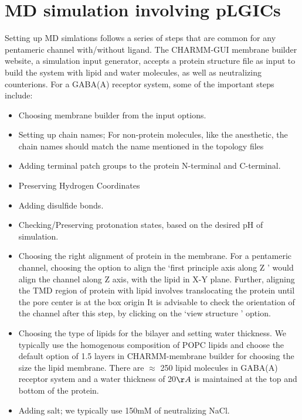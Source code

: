 \documentclass[12pt]{article}
\begin{document}
\section{MD simulation involving pLGICs}
\label{sec:genMD}
Setting up MD simlations follows a series of steps that are common for any pentameric channel with/without ligand. The CHARMM-GUI membrane builder website,\cite{Jo2009} a simulation input generator, accepts a protein structure file as input to build the system with lipid and water molecules, as well as neutralizing counterions. For a GABA(A) receptor system, some of the important steps include:
 	\begin{itemize}
		\item Choosing membrane builder from the input options.
		\item Setting up chain names; For non-protein molecules, like the anesthetic, the chain names should match the name mentioned in the topology files
		\item Adding terminal patch groups to the protein N-terminal and C-terminal.
		\item Preserving Hydrogen Coordinates
		\item Adding disulfide bonds.
		\item Checking/Preserving protonation states, based on the desired pH of simulation. 
		\item Choosing the right alignment of protein in the membrane. For a pentameric channel, choosing the option to align the `first principle axis along Z ' would align the channel along Z axis, with the lipid in X-Y plane. Further, aligning the TMD region of protein with lipid involves  translocating the protein until the pore center is at the box origin %
		It is advisable to check the orientation of the channel after this step, by clicking on the `view structure ' option.
		\item Choosing the type of lipids for the bilayer and setting water thickness. We typically use the homogenous composition of POPC lipids and choose the default option of  1.5 layers in CHARMM-membrane builder for choosing the size the lipid membrane. There are $\approx$ 250 lipid molecules in GABA(A) receptor system and a water thickness of 20$\AA$ is maintained at the top and bottom of the protein.
		\item Adding salt; we typically use 150mM of neutralizing NaCl.  
	\end{itemize}
\end{document}
